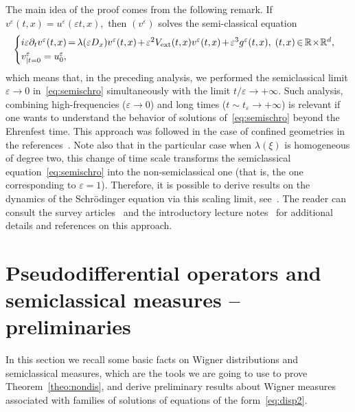 \documentclass[AHL,Unicode,longabstracts]{cedram}
\DeclareMathOperator{\ext}{ext}
\newcommand*\R{{\mathbb R}}
\newcommand*\eps{\varepsilon}
\numberwithin{equation}{section}
\newcommand*{\mk}{\mkern -1mu}
\newcommand*{\Mk}{\mkern -2mu}
\begin{document}
The main idea of the proof comes from the following remark. If~$v^\eps(t,x)= u^\eps(\eps t, x),$ then $(v^\eps)$ solves the semi-classical equation
\begin{equation}\label{eq:semischro}
\!\!\!\begin{cases}
i\eps \partial_{t} v^{\eps}(t,\mk x) \Mk=\Mk \lambda(\eps D_x) v^{\eps}(t,\mk x) \Mk+\Mk \eps^2 V_{\ext}(t,\mk x) v^{\eps}(t,\mk x)\Mk+\Mk\eps^3g^\eps(t,\mk x), \; (t,\mk x)\Mk\in\Mk\R\!\times\!\R^d,\\
v^\eps_{|t=0}=u^\eps_0,
\end{cases}\!\!\!\!
\end{equation}
which means that, in the preceding analysis, we performed the semiclassical limit $\eps\to 0$ in~\eqref{eq:semischro} simultaneously with the limit $t / \eps\to +\infty$. Such analysis, combining high-frequencies ($\eps\to 0$) and long times ($t\sim t_\eps\to +\infty$) is relevant if one wants to understand the behavior of solutions of~\eqref{eq:semischro} beyond the Ehrenfest time. This approach was followed in the case of confined geometries in the references~\cite{AFM:15,MaciaAv,MR:16}. Note also that in the particular case when $\lambda(\xi)$ is homogeneous of degree two, this change of time scale transforms the semiclassical equation~\eqref{eq:semischro} into the non-semiclassical one (that is, the one corresponding to $\eps=1$). Therefore, it is possible to derive results on the dynamics of the Schr\"odinger equation via this scaling limit, see~\cite{ALM:16,AM:14,AnRiv,MaciaTorus}. The reader can consult the survey articles~\cite{AM:12,MaciaDispersion} and the introductory lecture notes~\cite{MaciaLille} for additional details and references on this approach.


\section{Pseudodifferential operators and semiclassical measures -- preliminaries}\label{sec:semiclassical}

In this section we recall some basic facts on Wigner distributions and semiclassical measures, which are the tools we are going to use to prove Theorem~\ref{theo:nondis}, and derive preliminary results about Wigner measures associated with families of solutions of equations of the form~\eqref{eq:disp2}.
\end{document}
